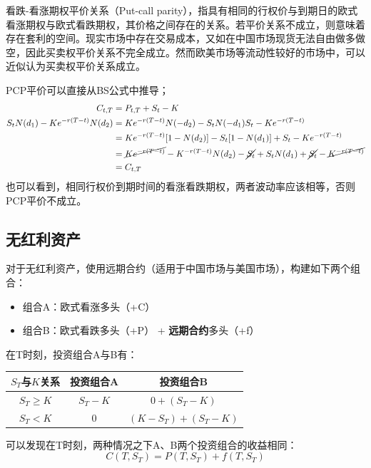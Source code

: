 \documentclass[11pt]{article}
\begin{document}
看跌-看涨期权平价关系（Put-call parity），指具有相同的行权价与到期日的欧式看涨期权与欧式看跌期权，其价格之间存在的关系。若平价关系不成立，则意味着存在套利的空间。现实市场中存在交易成本，又如在中国市场现货无法自由做多做空，因此买卖权平价关系不完全成立。然而欧美市场等流动性较好的市场中，可以近似认为买卖权平价关系成立。

PCP平价可以直接从BS公式中推导；
\begin{align*}
    C_{t,T} &= P_{t,T} + S_t -K \\
    S_t N(d_1) - K e^{-r(T-t)} N(d_2) &= K e^{-r(T-t)} N(-d_2) - S_t N(-d_1) S_t -Ke^{-r(T-t)} \\
    &= K e^{-r(T-t)} [1- N(d_2)] - S_t [1 - N(d_1) ] + S_t -Ke^{-r(T-t)} \\
    &= \cancel{K e^{-r(T-t)}} - K^{-r(T-t)} N(d_2) - \cancel{S_t} + S_t N(d_1) + \cancel{S_t} - \cancel{K^{-r(T-t)}} \\
    &= C_{t,T}
\end{align*}
也可以看到，相同行权价到期时间的看涨看跌期权，两者波动率应该相等，否则PCP平价不成立。

\subsection{无红利资产}

对于无红利资产，使用远期合约（适用于中国市场与美国市场），构建如下两个组合：
\begin{itemize}
    \item 组合A：欧式看涨多头（+C）
    \item 组合B：欧式看跌多头（+P） + \textbf{远期合约}多头（+f）
\end{itemize}

在T时刻，投资组合A与B有：
\begin{table}[H]
\centering
\begin{tabular}{ccc}
\toprule
$S_T$与$K$关系 & \multicolumn{1}{c}{投资组合A} & \multicolumn{1}{c}{投资组合B} \\
\midrule
$S_T \geq K$ & $S_T-K$ & $0 + (S_T-K)$ \\
$S_T < K$ & $0$ & $(K - S_T) + (S_T-K)$ \\ 
\bottomrule
\end{tabular}
\end{table}

可以发现在T时刻，两种情况之下A、B两个投资组合的收益相同：
\begin{equation*}
    C(T,S_T) = P(T,S_T) + f(T,S_T)
\end{equation*}
\end{document}
